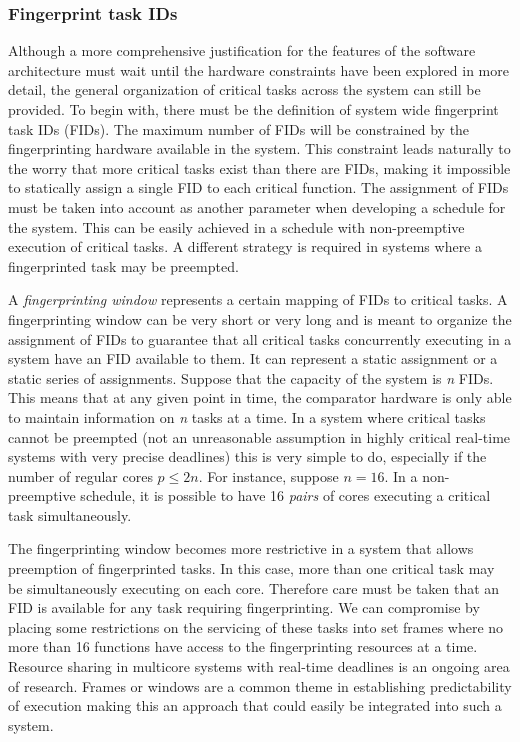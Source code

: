 \subsubsection{Fingerprint task IDs}
Although a more comprehensive justification for the features of the software architecture must wait until the hardware constraints have been explored in more detail, the general organization of critical tasks across the system can still be provided. To begin with, there must be the definition of system wide fingerprint task IDs (FIDs). The maximum number of FIDs will be constrained by the fingerprinting hardware available in the system. This constraint leads naturally to the worry that more critical tasks exist than there are FIDs, making it impossible to statically assign a single FID to each critical function. The assignment of FIDs must be taken into account as another parameter when developing a schedule for the system. This can be easily achieved in a schedule with non-preemptive execution of critical tasks. A different strategy is required in systems where a fingerprinted task may be preempted.

A \emph{fingerprinting window} represents a certain mapping of FIDs to critical tasks. A fingerprinting window can be very short or very long and is meant to organize the assignment of FIDs to guarantee that all critical tasks concurrently executing in a system have an FID available to them. It can represent a static assignment or a static series of assignments. Suppose that the capacity of the system is \emph{n} FIDs. This means that at any given point in time, the comparator hardware is only able to maintain information on \emph{n} tasks at a time. In a system where critical tasks cannot be preempted (not an unreasonable assumption in highly critical real-time systems with very precise deadlines) this is very simple to do, especially if the number of regular cores $p \leq 2n$. For instance, suppose $n = 16$. In a non-preemptive schedule, it is possible to have 16 \emph{pairs} of cores executing a critical task simultaneously.

The fingerprinting window becomes more restrictive in a system that allows preemption of fingerprinted tasks. In this case, more than one critical task may be simultaneously executing on each core. Therefore care must be taken that an FID is available for any task requiring fingerprinting. We can compromise by placing some restrictions on the servicing of these tasks into set frames where no more than 16 functions have access to the fingerprinting resources at a time. Resource sharing in multicore systems with real-time deadlines is an ongoing area of research. Frames or windows are a common theme in establishing predictability of execution making this an approach that could easily be integrated into such a system.

